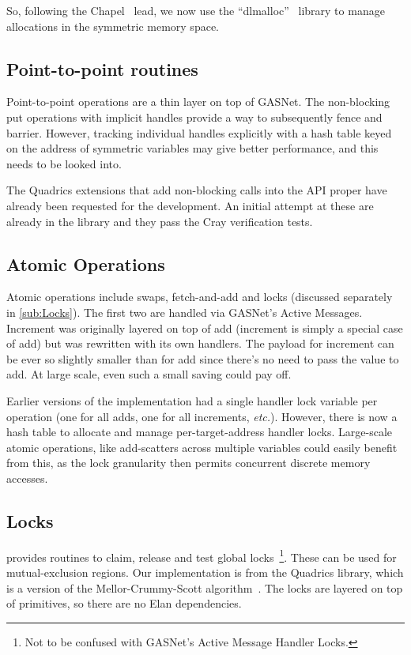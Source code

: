 So, following the Chapel~\cite{chapel} lead, we now use the
``dlmalloc''~\cite{dlmalloc} library to manage allocations in the
symmetric memory space.

\subsection{Point-to-point routines}

Point-to-point operations are a thin layer on top of GASNet. The
non-blocking put operations with implicit handles provide a way to
subsequently fence and barrier. However, tracking individual handles
explicitly with a hash table keyed on the address of symmetric
variables may give better performance, and this needs to be looked
into.

The Quadrics extensions that add non-blocking calls into the API
proper have already been requested for the \openshmem development. An
initial attempt at these are already in the library and they pass the
Cray verification tests.

\subsection{Atomic Operations}

Atomic operations include swaps, fetch-and-add and locks (discussed
separately in \ref{sub:Locks}). The first two are handled via GASNet's
Active Messages. Increment was originally layered on top of add
(increment is simply a special case of add) but was rewritten with its
own handlers. The payload for increment can be ever so slightly
smaller than for add since there's no need to pass the value to
add. At large scale, even such a small saving could pay off.

Earlier versions of the implementation had a single handler lock
variable per operation (one for all adds, one for all increments,
\emph{etc.}).  However, there is now a hash table to allocate and
manage per-target-address handler locks. Large-scale atomic
operations, like add-scatters across multiple variables could easily
benefit from this, as the lock granularity then permits concurrent
discrete memory accesses.

\subsection{\label{sub:Locks}Locks}

\openshmem provides routines to claim, release and test global
locks~\footnote{Not to be confused with GASNet's Active Message
  Handler Locks.}.  These can be used for mutual-exclusion
regions. Our implementation is from the Quadrics library, which is a
version of the Mellor-Crummy-Scott
algorithm~\cite{Mellor-Crummey:1991:ASS:103727.103729}.  The locks are
layered on top of \openshmem primitives, so there are no Elan
dependencies.


